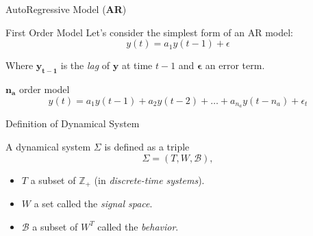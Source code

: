 \documentclass[aspectratio=169,hyperref={pdfpagelabels=false}]{beamer}
\begin{document}
\begin{frame}{AutoRegressive Model (\textbf{AR})}
\begin{block}{First Order Model}
  Let's consider the simplest form of an AR model:
  \begin{equation*}
    y(t) = a_1 y(t-1) + \epsilon
  \end{equation*}
\end{block}
  Where $\bm{y_{t-1}}$ is the \textit{lag} of $\bm{y}$ at time $t-1$ and $\bm{\epsilon}$ an error term. 
  \begin{block}{$\bm{n_a}$ order model}
    \begin{equation*}
      y(t) = {a}_{1}y(t-1) + a_{2}y(t-2) + \dots + a_{n_a}y(t-n_a) + \epsilon_t
    \end{equation*}
  \end{block}
\end{frame}

\begin{frame}{Definition of Dynamical System}
  \begin{block}{}
    A dynamical system $\Sigma$ is defined as a triple
  \[
    \Sigma = (T, W, \mathscr{B}),
  \]
  \begin{itemize}
    \item $T$ a subset of $\mathbb{Z}_+$ (in \textit{discrete-time systems}).
    \item $W$ a set called the \textit{signal space}.
    \item $\mathscr{B}$ a subset of $W^T$ called the \textit{behavior}.
  \end{itemize}
  \end{block}
  \let\thefootnote\relax{}
\end{frame}
\end{document}
